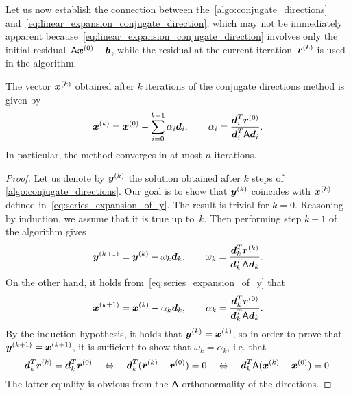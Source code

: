 Let us now establish the connection between the~\cref{algo:conjugate_directions} and~\eqref{eq:linear_expansion_conjugate_direction},
which may not be immediately apparent because~\eqref{eq:linear_expansion_conjugate_direction} involves only the initial residual~$\mathsf A \mathbf{\boldsymbol{x}}^{(0)} - \mathbf{\boldsymbol{b}}$,
while the residual at the current iteration~$\mathbf{\boldsymbol{r}}^{(k)}$ is used in the algorithm.
\begin{proposition}
    \label{proposition:conjugate_directions}
    The vector $\mathbf{\boldsymbol{x}}^{(k)}$ obtained after $k$ iterations of the conjugate directions method is given by
    \begin{equation}
        \label{eq:series_expansion_of_y}
        \mathbf{\boldsymbol{x}}^{(k)} = \mathbf{\boldsymbol{x}}^{(0)}
        - \sum_{i=0}^{k-1} \alpha_i \mathbf{\boldsymbol{d}}_i,
        \qquad \alpha_i = \frac{\mathbf{\boldsymbol{d}}_i^T \mathbf{\boldsymbol{r}}^{(0)}}{\mathbf{\boldsymbol{d}}_i^T \mathsf A \mathbf{\boldsymbol{d}}_i}.
    \end{equation}
    In particular,
    the method converges in at most $n$ iterations.
\end{proposition}
\begin{proof}
    Let us denote by $\mathbf{\boldsymbol{y}}^{(k)}$ the solution obtained after $k$ steps of \cref{algo:conjugate_directions}.
    Our goal is to show that $\mathbf{\boldsymbol{y}}^{(k)}$ coincides with $\mathbf{\boldsymbol{x}}^{(k)}$ defined in~\eqref{eq:series_expansion_of_y}.
    The result is trivial for $k = 0$.
    Reasoning by induction,
    we assume that it is true up to~$k$.
    Then performing step $k+1$ of the algorithm gives
    \[
        \mathbf{\boldsymbol{y}}^{(k+1)} = \mathbf{\boldsymbol{y}}^{(k)} - \omega_k \mathbf{\boldsymbol{d}}_k, \qquad \omega_k = \frac{\mathbf{\boldsymbol{d}}_k^T \mathbf{\boldsymbol{r}}^{(k)}}{\mathbf{\boldsymbol{d}}_k^T \mathsf A \mathbf{\boldsymbol{d}}_k}.
    \]
    On the other hand,
    it holds from~\eqref{eq:series_expansion_of_y} that
    \[
        \mathbf{\boldsymbol{x}}^{(k+1)} = \mathbf{\boldsymbol{x}}^{(k)} - \alpha_k \mathbf{\boldsymbol{d}}_k, \qquad \alpha_k = \frac{\mathbf{\boldsymbol{d}}_k^T \mathbf{\boldsymbol{r}}^{(0)}}{\mathbf{\boldsymbol{d}}_k^T \mathsf A \mathbf{\boldsymbol{d}}_k}.
    \]
    By the induction hypothesis, it holds that $\mathbf{\boldsymbol{y}}^{(k)} = \mathbf{\boldsymbol{x}}^{(k)}$,
    so in order to prove that $\mathbf{\boldsymbol{y}}^{(k+1)} = \mathbf{\boldsymbol{x}}^{(k+1)}$,
    it is sufficient to show that $\omega_k = \alpha_k$, i.e. that
    \[
        \mathbf{\boldsymbol{d}}_k^T \mathbf{\boldsymbol{r}}^{(k)} = \mathbf{\boldsymbol{d}}_k^T \mathbf{\boldsymbol{r}}^{(0)}
        \quad \Leftrightarrow \quad
        \mathbf{\boldsymbol{d}}_k^T (\mathbf{\boldsymbol{r}}^{(k)} - \mathbf{\boldsymbol{r}}^{(0)}) = 0
        \quad \Leftrightarrow \quad
        \mathbf{\boldsymbol{d}}_k^T \mathsf A (\mathbf{\boldsymbol{x}}^{(k)} - \mathbf{\boldsymbol{x}}^{(0)}) = 0.
    \]
    The latter equality is obvious from the $\mathsf A$-orthonormality of the directions.
\end{proof}

